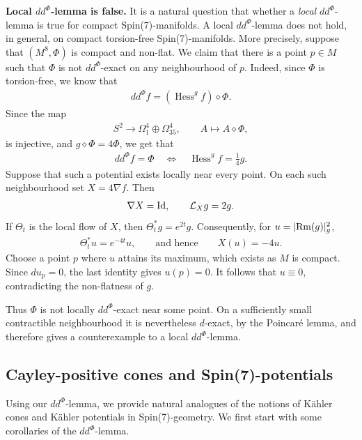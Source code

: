 \documentclass[10pt,a4paper,reqno]{article}
\theoremstyle{definition}
\numberwithin{equation}{section}
\def\ddphi{dd^{\Phi}}
\begin{document}
{\textbf{Local $\ddphi$-lemma is false.}} It is a natural question that whether a \emph{local} $\ddphi$-lemma is true for compact Spin(7)-manifolds. A local $dd^\Phi$-lemma does not hold, in general, on compact torsion-free Spin(7)-manifolds. More precisely, suppose that $(M^8,\Phi)$ is compact and non-flat. We claim that there is a point $p\in M$ such that $\Phi$ is not $dd^\Phi$-exact on any neighbourhood of $p$. Indeed, since $\Phi$ is torsion-free, we know that
\begin{align*}
dd^\Phi f=(\operatorname{Hess}^g f)\diamond\Phi.
\end{align*}
Since the map
\begin{align*}
S^2 \longrightarrow\Omega^4_1\oplus\Omega^4_{35},
	\qquad A\longmapsto A\diamond\Phi,
\end{align*}
is injective, and $g\diamond\Phi=4\Phi$, we get that
\begin{align*}
dd^\Phi f=\Phi \quad\Longleftrightarrow\quad
	\operatorname{Hess}^g f=\frac14 g.
\end{align*}
Suppose that such a potential exists locally near every point. On each
such neighbourhood set $X=4\nabla f$. Then
\begin{align*}
\nabla X={\rm{Id}},\qquad \mathcal L_Xg=2g.
\end{align*}
If $\Theta_t$ is the local flow of $X$, then $\Theta_t^*g=e^{2t}g$. Consequently, for $u=|{\rm{Rm}}(g)|_g^2$,
\begin{align*}
\Theta_t^*u=e^{-4t}u, \qquad\text{and hence}\qquad X(u)=-4u.
\end{align*}
Choose a point $p$ where $u$ attains its maximum, which exists as $M$ is compact. Since $du_p=0$, the last identity gives $u(p)=0$. It follows that $u\equiv0$, contradicting the non-flatness of $g$.
	
Thus $\Phi$ is not locally $dd^\Phi$-exact near some point. On a sufficiently small contractible neighbourhood it is nevertheless
$d$-exact, by the Poincaré lemma, and therefore gives a counterexample
to a local $dd^\Phi$-lemma.


\subsection{Cayley-positive cones and Spin(7)-potentials}\label{subsec:cayleypositive}

Using our $\ddphi$-lemma, we provide natural analogues of the notions of K\"ahler cones and K\"ahler potentials in Spin(7)-geometry. We first start with some corollaries of the $\ddphi$-lemma.
\end{document}
